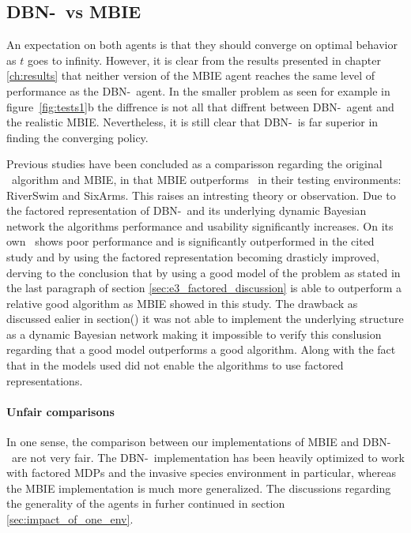 \subsection{DBN-\etre\ vs MBIE }
An expectation on both agents is that they should converge on optimal behavior
as $t$ goes to infinity. However, it is clear from the results presented in
chapter \ref{ch:results} that neither version of the MBIE agent reaches the
same level of performance as the DBN-\etre\ agent. In the smaller problem as
seen for example in figure~\ref{fig:tests1}b the diffrence is not all that
diffrent between DBN-\etre\ agent and the realistic MBIE. Nevertheless, it is still clear that DBN-\etre\ is far superior in finding the converging policy.

Previous studies have been concluded as a comparisson regarding the original
\etre\ algorithm and MBIE, in \textcite{strehl2004empirical} that MBIE
outperforms \etre\ in their testing environments: RiverSwim and SixArms. This raises an intresting theory or observation. Due to the factored representation of DBN-\etre\ and its underlying dynamic Bayesian network the algorithms performance and usability significantly increases. On its own \etre\ shows poor performance and is significantly outperformed in the cited study and by using the factored representation becoming drasticly improved, derving to the conclusion that by using a good model of the problem as stated in the last paragraph of section \ref{sec:e3_factored_discussion} is able to outperform a relative good algorithm as MBIE showed in this study. The drawback as discussed ealier in section() it was not able to implement the underlying structure as a dynamic Bayesian network making it impossible to verify this conslusion regarding that a good model outperforms a good algorithm. Along with the fact that in \textcite{strehl2004empirical} the models used did not enable the algorithms to use factored representations.


\paragraph{Unfair comparisons}
In one sense, the comparison between our implementations of MBIE and DBN-\etre\
are not very fair. The DBN-\etre\ implementation has been heavily optimized to
work with factored MDPs and the invasive species environment in particular,
whereas the MBIE implementation is much more generalized. The discussions
regarding the generality of the agents in furher continued in section
\ref{sec:impact_of_one_env}. 

